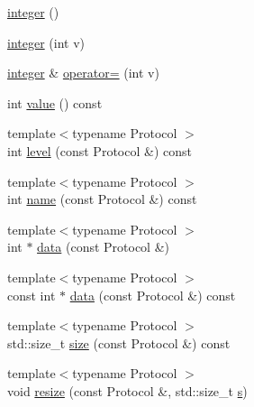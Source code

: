 \begin{DoxyCompactItemize}
\item 
\hyperlink{classasio_1_1detail_1_1socket__option_1_1integer_ab0baa218bc4434a74f35f24d66b0ae29}{integer} ()
\item 
\hyperlink{classasio_1_1detail_1_1socket__option_1_1integer_aeded2e75b3ed86cc1ea96a3747cdd821}{integer} (int v)
\item 
\hyperlink{classasio_1_1detail_1_1socket__option_1_1integer}{integer} \& \hyperlink{classasio_1_1detail_1_1socket__option_1_1integer_a244348d3e130316a1f6d4c83396e5ec8}{operator=} (int v)
\item 
int \hyperlink{classasio_1_1detail_1_1socket__option_1_1integer_ad6e8900fd60200bff74b9f7e4bbde513}{value} () const 
\item 
{\footnotesize template$<$typename Protocol $>$ }\\int \hyperlink{classasio_1_1detail_1_1socket__option_1_1integer_a8a11b172eaf1e0a457836faaea2e94b8}{level} (const Protocol \&) const 
\item 
{\footnotesize template$<$typename Protocol $>$ }\\int \hyperlink{classasio_1_1detail_1_1socket__option_1_1integer_a84f8f9a0554ce2172ee84ae01b5b638c}{name} (const Protocol \&) const 
\item 
{\footnotesize template$<$typename Protocol $>$ }\\int $\ast$ \hyperlink{classasio_1_1detail_1_1socket__option_1_1integer_a8b81207c35ff1223a9363d94ac219fee}{data} (const Protocol \&)
\item 
{\footnotesize template$<$typename Protocol $>$ }\\const int $\ast$ \hyperlink{classasio_1_1detail_1_1socket__option_1_1integer_ac3080a7335ffd22e29fbd8831bc149db}{data} (const Protocol \&) const 
\item 
{\footnotesize template$<$typename Protocol $>$ }\\std\+::size\+\_\+t \hyperlink{classasio_1_1detail_1_1socket__option_1_1integer_a8e03804aeb1f53dc49d6e20257ef9b58}{size} (const Protocol \&) const 
\item 
{\footnotesize template$<$typename Protocol $>$ }\\void \hyperlink{classasio_1_1detail_1_1socket__option_1_1integer_ad1c86a21c2d66d1bc16e03706cb44276}{resize} (const Protocol \&, std\+::size\+\_\+t \hyperlink{group__async__connect_ga31ab74b9ea6c77932dddd016cfc7920a}{s})
\end{DoxyCompactItemize}


